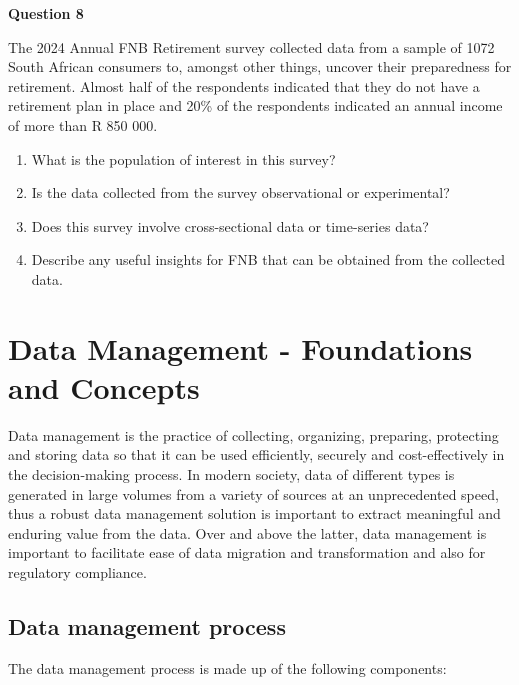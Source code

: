 \documentclass[
]{book}
\begin{document}
\textbf{Question 8}

The 2024 Annual FNB Retirement survey collected data from a sample of 1072 South African consumers to, amongst other things, uncover their preparedness for retirement. Almost half of the respondents indicated that they do not have a retirement plan in place and 20\% of the respondents indicated an annual income of more than R 850 000.

\begin{enumerate}
\def\labelenumi{\alph{enumi}.}
\item
  What is the population of interest in this survey?
\item
  Is the data collected from the survey observational or experimental?
\item
  Does this survey involve cross-sectional data or time-series data?
\item
  Describe any useful insights for FNB that can be obtained from the collected data.
\end{enumerate}

\newpage

\section{Data Management - Foundations and Concepts}\label{sec1-3}

Data management is the practice of collecting, organizing, preparing, protecting and storing data so that it can be used efficiently, securely and cost-effectively in the decision-making process. In modern society, data of different types is generated in large volumes from a variety of sources at an unprecedented speed, thus a robust data management solution is important to extract meaningful and enduring value from the data. Over and above the latter, data management is important to facilitate ease of data migration and transformation and also for regulatory compliance.

\subsection{Data management process}\label{data-management-process}

The data management process is made up of the following components:
\end{document}
